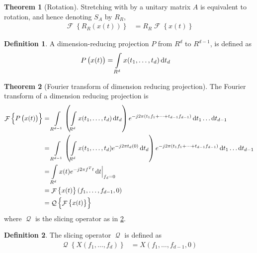 \documentclass[titlepage, fleqn, a4paper, 12pt, twoside]{article}
\theoremstyle{definition}
\newtheorem{definition}{Definition}
\theoremstyle{theorem}
\newtheorem{theorem}{Theorem}
\DeclareMathOperator{\FT}{\mathcal{F}}
\DeclareMathOperator{\Q}{\mathcal{Q}}
\begin{document}
\begin{theorem}[Rotation]
	Stretching with by a unitary matrix $A$ is equivalent to rotation, and hence denoting $S_A$ by $R_R$,
	\begin{align*}
		\FT\left\{ R_R\left( x(t) \right) \right\} &= R_R \FT\left\{ x(t) \right\}
	\end{align*}
	\label{thm:rotation}
\end{theorem}

\begin{definition}
	A dimension-reducing projection $P$ from $R^d$ to $R^{d - 1}$, is defined as
	\begin{align*}
		P\left( x(t) \right) &= \int\limits_{R^d} x(t_1,\dots,t_d) \dif t_d
	\end{align*}
\end{definition}

\begin{theorem}[Fourier transform of dimension reducing projection]
	The Fourier transform of a dimension reducing projection is
	\begin{align*}
		\FT\left\{ P\left( x(t) \right) \right\} &= \int\limits_{R^{d - 1}} \left( \int\limits_{R^d} x(t_1,\dots,t_d) \dif t_d \right) e^{-j 2 \pi (t_1 f_1 + \dots + t_{d - 1} f_{d - 1})} \dif t_1 \dots \dif t_{d - 1}\\
		&= \int\limits_{R^{d - 1}} \left( \int\limits_{R^d} x(t_1,\dots,t_d) e^{-j 2 \pi t_d (0)} \dif t_d \right) e^{-j 2 \pi (t_1 f_1 + \dots + t_{d - 1} f_{d - 1})} \dif t_1 \dots \dif t_{d - 1}\\
		&= \int\limits_{R^d} x(t) e^{-j 2 \pi f^T t} \dif t \Big|_{f_d = 0}\\
		&= \FT\left\{ x(t) \right\}(f_1,\dots,f_{d - 1},0)\\
		&= \Q\left\{ \FT\left\{ x(t) \right\} \right\}
	\end{align*}
	where $\Q$ is the slicing operator as in \cref{def:slicing_operator}.
	\label{thm:Fourier_transform_of_dimension_reducing_projection}
\end{theorem}

\begin{definition}
	The slicing operator $\Q$ is defined as
	\begin{align*}
		\Q\left\{ X(f_1,\dots,f_d) \right\} &= X\left( f_1,\dots,f_{d - 1},0 \right)
	\end{align*}
	\label{def:slicing_operator}
\end{definition}
\end{document}
